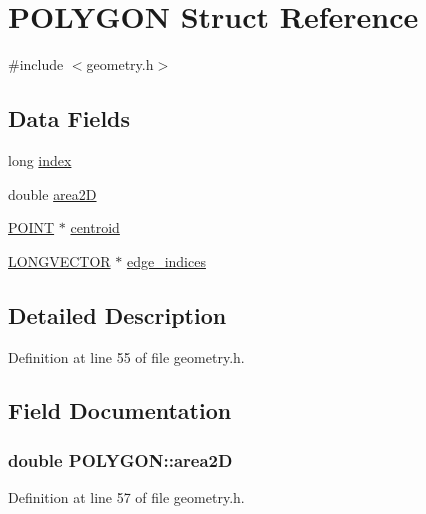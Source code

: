 \hypertarget{struct_p_o_l_y_g_o_n}{\section{P\-O\-L\-Y\-G\-O\-N Struct Reference}
\label{struct_p_o_l_y_g_o_n}
}


{\ttfamily \#include $<$geometry.\-h$>$}

\subsection*{Data Fields}
\begin{DoxyCompactItemize}
\item 
long \hyperlink{struct_p_o_l_y_g_o_n_afb5c12ae7531477e5e40bacd86502ebb}{index}
\item 
double \hyperlink{struct_p_o_l_y_g_o_n_aed3f70c370781706fa2b5f608e601a62}{area2\-D}
\item 
\hyperlink{struct_p_o_i_n_t}{P\-O\-I\-N\-T} $\ast$ \hyperlink{struct_p_o_l_y_g_o_n_a5a3b288be4c6fad14c818136e35c1411}{centroid}
\item 
\hyperlink{struct_l_o_n_g_v_e_c_t_o_r}{L\-O\-N\-G\-V\-E\-C\-T\-O\-R} $\ast$ \hyperlink{struct_p_o_l_y_g_o_n_a6bf24b7f06695c476fd1169b70e3ef25}{edge\-\_\-indices}
\end{DoxyCompactItemize}


\subsection{Detailed Description}


Definition at line 55 of file geometry.\-h.



\subsection{Field Documentation}
\hypertarget{struct_p_o_l_y_g_o_n_aed3f70c370781706fa2b5f608e601a62}{
\subsubsection[{area2\-D}]{\setlength{\rightskip}{0pt plus 5cm}double P\-O\-L\-Y\-G\-O\-N\-::area2\-D}}\label{struct_p_o_l_y_g_o_n_aed3f70c370781706fa2b5f608e601a62}


Definition at line 57 of file geometry.\-h.



